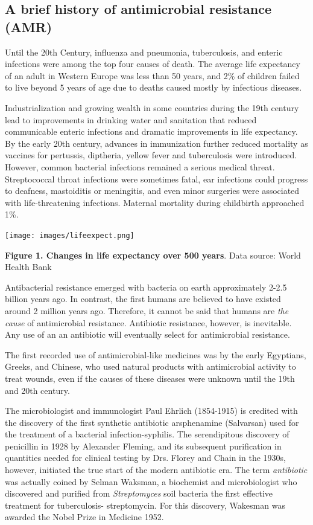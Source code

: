 \documentclass[
  11pt,
  paper=a4,
  ,captions=tableheading
]{scrartcl}
\begin{document}
\hypertarget{a-brief-history-of-antimicrobial-resistance-amr}{%
\subsection*{A brief history of antimicrobial resistance
(AMR)}\label{a-brief-history-of-antimicrobial-resistance-amr}}

Until the 20th Century, influenza and pneumonia, tuberculosis, and
enteric infections were among the top four causes of death. The average
life expectancy of an adult in Western Europe was less than 50 years,
and 2\% of children failed to live beyond 5 years of age due to deaths
caused mostly by infectious diseases.

Industrialization and growing wealth in some countries during the 19th
century lead to improvements in drinking water and sanitation that
reduced communicable enteric infections and dramatic improvements in
life expectancy. By the early 20th century, advances in immunization
further reduced mortality as vaccines for pertussis, diptheria, yellow
fever and tuberculosis were introduced. However, common bacterial
infections remained a serious medical threat. Streptococcal throat
infections were sometimes fatal, ear infections could progress to
deafness, mastoiditis or meningitis, and even minor surgeries were
associated with life-threatening infections. Maternal mortality during
childbirth approached 1\%.

\texttt{[image: images/lifeexpect.png]}

\textbf{Figure 1. Changes in life expectancy over 500 years}. Data
source: World Health Bank

Antibacterial resistance emerged with bacteria on earth approximately
2-2.5 billion years ago. In contrast, the first humans are believed to
have existed around 2 million years ago. Therefore, it cannot be said
that humans are \emph{the cause} of antimicrobial resistance. Antibiotic
resistance, however, is inevitable. Any use of an an antibiotic will
eventually select for antimicrobial resistance.

The first recorded use of antimicrobial-like medicines was by the early
Egyptians, Greeks, and Chinese, who used natural products with
antimicrobial activity to treat wounds, even if the causes of these
diseases were unknown until the 19th and 20th century.

The microbiologist and immunologist Paul Ehrlich (1854-1915) is credited
with the discovery of the first synthetic antibiotic arsphenamine
(Salvarsan) used for the treatment of a bacterial infection-syphilis.
The serendipitous discovery of penicillin in 1928 by Alexander Fleming,
and its subsequent purification in quantities needed for clinical
testing by Drs. Florey and Chain in the 1930s, however, initiated the
true start of the modern antibiotic era. The term \emph{antibiotic} was
actually coined by Selman Waksman, a biochemist and microbiologist who
discovered and purified from \emph{Streptomyces} soil bacteria the first
effective treatment for tuberculosis- streptomycin. For this discovery,
Wakesman was awarded the Nobel Prize in Medicine 1952.
\end{document}
